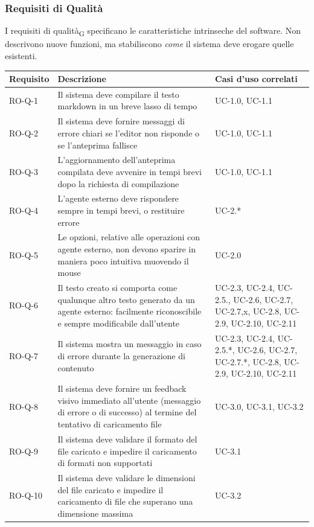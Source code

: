 \documentclass[11pt,a4paper]{article}
\begin{document}
\subsubsection{Requisiti di Qualità}
I requisiti di qualità\textsubscript{G} specificano le caratteristiche intrinseche del software. Non descrivono nuove funzioni, ma stabiliscono \textit{come} il sistema deve erogare quelle esistenti. 
\begin{longtable}{|p{}|>{\raggedright\arraybackslash}p{}|p{}|}
\hline
\textbf{Requisito} & \textbf{Descrizione} & \textbf{Casi d'uso correlati}\\
\hline

RO-Q-1 & Il sistema deve compilare il testo markdown in un breve lasso di tempo & UC-1.0, UC-1.1 \\
\hline
RO-Q-2 & Il sistema deve fornire messaggi di errore chiari se l'editor non risponde o se l'anteprima fallisce & UC-1.0, UC-1.1 \\
\hline
RO-Q-3 & L'aggiornamento dell'anteprima compilata deve avvenire in tempi brevi dopo la richiesta di compilazione & UC-1.0, UC-1.1 \\
\hline
RO-Q-4 & L'agente esterno deve rispondere sempre in tempi brevi, o restituire errore & UC-2.* \\
\hline
RO-Q-5 & Le opzioni, relative alle operazioni con agente esterno, non devono sparire in maniera poco intuitiva muovendo il mouse & UC-2.0 \\
\hline
RO-Q-6 & Il testo creato si comporta come qualunque altro testo generato da un agente esterno: facilmente riconoscibile e sempre modificabile dall'utente & UC-2.3, UC-2.4, UC-2.5., UC-2.6, UC-2.7, UC-2.7,x, UC-2.8, UC-2.9, UC-2.10, UC-2.11 \\
\hline
RO-Q-7 & Il sistema mostra un messaggio in caso di errore durante la generazione di contenuto & UC-2.3, UC-2.4, UC-2.5.*, UC-2.6, UC-2.7, UC-2.7.*, UC-2.8, UC-2.9, UC-2.10, UC-2.11 \\
\hline
RO-Q-8 & Il sistema deve fornire un feedback visivo immediato all'utente (messaggio di errore o di successo) al termine del tentativo di caricamento file & UC-3.0, UC-3.1, UC-3.2 \\
\hline
RO-Q-9 & Il sistema deve validare il formato del file caricato e impedire il caricamento di formati non supportati & UC-3.1 \\
\hline
RO-Q-10 & Il sistema deve validare le dimensioni del file caricato e impedire il caricamento di file che superano una dimensione massima & UC-3.2 \\

\end{longtable}
\end{document}
